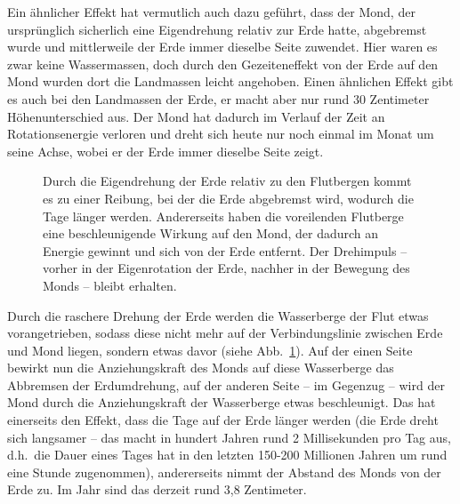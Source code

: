 Ein \"ahnlicher Effekt hat vermutlich auch dazu gef\"uhrt, dass der Mond, der urspr\"unglich
sicherlich eine Eigendrehung relativ zur Erde hatte, abgebremst wurde und mittlerweile
der Erde immer dieselbe Seite zuwendet. Hier waren es zwar keine Wassermassen, doch
durch den Gezeiteneffekt von der Erde auf den Mond wurden dort die Landmassen
leicht angehoben. Einen \"ahnlichen Effekt gibt es auch bei den Landmassen der Erde, er
macht aber nur rund 30 Zentimeter H\"ohenunterschied aus. Der Mond hat dadurch im
Verlauf der Zeit an Rotationsenergie verloren und dreht sich heute nur noch einmal im
Monat um seine Achse, wobei er der Erde immer dieselbe Seite zeigt.

\begin{figure}[htb]
%
\caption{\label{fig_Bremsen}%
Durch die Eigendrehung der Erde relativ zu den Flutbergen kommt es zu einer
\glqq Reibung\grqq, bei der die Erde abgebremst wird, wodurch die Tage 
l\"anger werden. Andererseits haben die voreilenden Flutberge eine beschleunigende
Wirkung auf den Mond, der
dadurch an Energie gewinnt und sich von der Erde entfernt. Der Drehimpuls -- vorher
in der Eigenrotation der Erde, nachher in der Bewegung des Monds -- bleibt erhalten.}
\end{figure}

Durch die raschere Drehung der Erde werden die Wasserberge der Flut etwas
vorangetrieben, sodass diese nicht mehr auf der Verbindungslinie zwischen Erde und
Mond liegen, sondern etwas davor (siehe Abb.\ \ref{fig_Bremsen}). Auf der einen Seite
bewirkt nun die Anziehungskraft des Monds auf diese Wasserberge das Abbremsen
der Erdumdrehung, auf der anderen Seite -- im Gegenzug -- wird der Mond durch die
Anziehungskraft der Wasserberge etwas beschleunigt. Das hat einerseits den Effekt, dass
die Tage auf der Erde l\"anger werden (die Erde dreht sich langsamer -- das macht in hundert
Jahren rund 2 Millisekunden pro Tag aus, d.h.\ die Dauer eines Tages hat in den letzten 150-200
Millionen Jahren um rund eine Stunde zugenommen), andererseits
nimmt der Abstand des Monds von der Erde zu. Im Jahr sind das derzeit rund 3,8 Zentimeter. 

